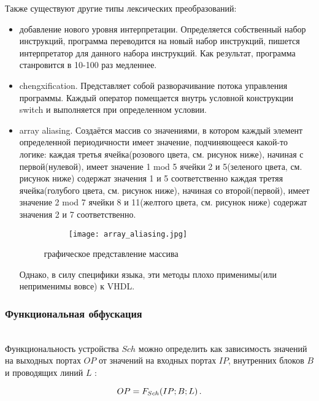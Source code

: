 Также существуют другие типы лексических преобразований:
\begin{itemize}
\item добавление нового уровня интерпретации. Определяется собственный набор инструкций, программа переводится на новый набор инструкций, пишется интерпретатор для данного набора инструкций. Как результат, программа станровится в 10-100 раз медленнее.
\item chengxification. Представляет собой разворачивание потока управления программы. Каждый оператор помещается внутрь условной конструкции switch и выполняется при определенном условии.
\item array aliasing. Создаётся массив со значениями, в котором каждый элемент определенной периодичности имеет значение, подчиняющееся какой-то логике\cite{collberg}:
    \subitem каждая третья ячейка(розового цвета, см. рисунок ниже), начиная с первой(нулевой), имеет значение 1 mod 5
    \subitem ячейки 2 и 5(зеленого цвета, см. рисунок ниже) содержат значения 1 и 5 соответственно
    \subitem каждая третяя ячейка(голубого цвета, см. рисунок ниже), начиная со второй(первой), имеет значение 2 mod 7
    \subitem ячейки 8 и 11(желтого цвета, см. рисунок ниже) содержат значения 2 и 7 соответственно.

\begin{figure}[ht]
\centering
  \begin{subfigure}[b]{1\textwidth}
    \centering
    \texttt{[image: array\_aliasing.jpg]}
    \caption{}
  \end{subfigure}
  \caption{ графическое представление массива }
  \label{fig:fire_alarms}
\end{figure}

Однако, в силу специфики языка, эти методы плохо применимы(или неприменимы вовсе) к VHDL.
\end{itemize}

\subsubsection{Функциональная обфускация}~\\


Функциональность устройства $Sch$ можно определить как зависимость значений на выходных портах $OP$ от значений на входных портах $IP$, внутренних блоков $B$ и проводящих линий $L$ \cite{ivaniuk}:

\begin{equation}
  OP = F_{Sch} (IP;B;L) \text{\,.}
  \label{eq:domain:functional:basis}
\end{equation}

